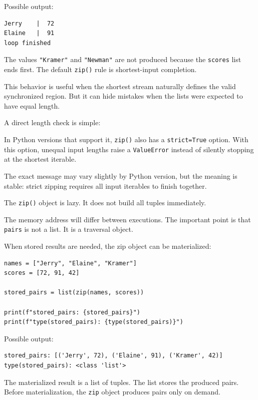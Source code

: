 Possible output:

\begin{verbatim}
Jerry    |  72
Elaine   |  91
loop finished
\end{verbatim}

The values \texttt{"Kramer"} and \texttt{"Newman"} are not produced because the \texttt{scores} list ends first. The default \texttt{zip()} rule is shortest-input completion.

This behavior is useful when the shortest stream naturally defines the valid synchronized region. But it can hide mistakes when the lists were expected to have equal length.

A direct length check is simple:

In Python versions that support it, \texttt{zip()} also has a \texttt{strict=True} option. With this option, unequal input lengths raise a \texttt{ValueError} instead of silently stopping at the shortest iterable.

The exact message may vary slightly by Python version, but the meaning is stable: strict zipping requires all input iterables to finish together.

The \texttt{zip()} object is lazy. It does not build all tuples immediately.

The memory address will differ between executions. The important point is that \texttt{pairs} is not a list. It is a traversal object.

When stored results are needed, the zip object can be materialized:

\begin{verbatim}
names = ["Jerry", "Elaine", "Kramer"]
scores = [72, 91, 42]

stored_pairs = list(zip(names, scores))

print(f"stored_pairs: {stored_pairs}")
print(f"type(stored_pairs): {type(stored_pairs)}")
\end{verbatim}

Possible output:

\begin{verbatim}
stored_pairs: [('Jerry', 72), ('Elaine', 91), ('Kramer', 42)]
type(stored_pairs): <class 'list'>
\end{verbatim}

The materialized result is a list of tuples. The list stores the produced pairs. Before materialization, the \texttt{zip} object produces pairs only on demand.

